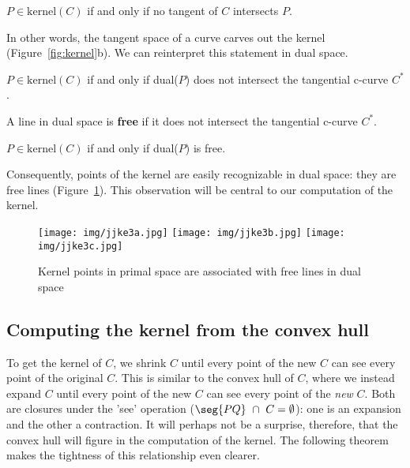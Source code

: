 \documentclass[12pt]{article}
\begin{document}
\begin{lemma}[Elber]
\label{lem:kernel}
$P \in \mbox{kernel}(C)$ if and only if no tangent of $C$ intersects $P$.
\end{lemma}

\noindent In other words, the tangent space 
of a curve carves out the kernel (Figure~\ref{fig:kernel}b).
We can reinterpret this statement in dual space.

\begin{corollary}
$P \in \mbox{kernel}(C)$ if and only if dual($P$) does not intersect the 
tangential c-curve $C^*$.
\end{corollary}

\begin{defn2}
A line in dual space is {\bf free} if it does not intersect the 
tangential c-curve $C^*$.
\end{defn2}

\begin{corollary}
\label{cor:free}
$P \in \mbox{kernel}(C)$ if and only if dual($P$) is free.
\end{corollary}

\noindent Consequently, points of the kernel are easily recognizable in dual space:
they are free lines (Figure~\ref{fig:freeline}).
This observation will be central to our computation of the kernel.

\begin{figure}
\begin{center}
\texttt{[image: img/jjke3a.jpg]}
\texttt{[image: img/jjke3b.jpg]}
\texttt{[image: img/jjke3c.jpg]}
\end{center}
\caption{Kernel points in primal space are associated with free lines in dual space}
\label{fig:freeline}
\end{figure}

\subsection{Computing the kernel from the convex hull}

To get the kernel of $C$, we shrink $C$ until every point of the new $C$
can see every point of the original $C$.
This is similar to the convex hull of $C$, where 
we instead expand $C$ until every point of
the new $C$ can see every point of the {\em new} $C$.
Both are closures under the 'see' operation ($\seg{PQ}\ \cap \ C = \emptyset$):
one is an expansion and the other a contraction.
It will perhaps not be a surprise, therefore, that the convex hull
will figure in the computation of the kernel.
The following theorem makes the tightness of this relationship even clearer.
\end{document}
